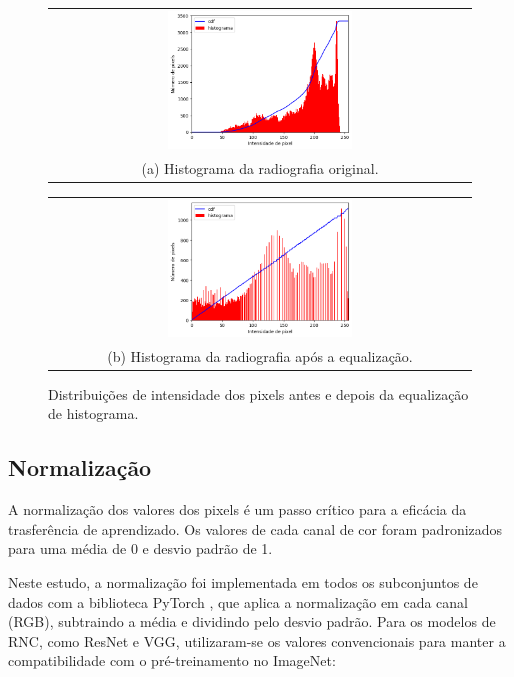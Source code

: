 \begin{figure}[!htbp]
    \centering
    \begin{tabular}{@{}c@{}}
        \includegraphics[width=0.45\textwidth]{figs/histograma-imagem-nao-equalizada.png} \\[\abovecaptionskip]
        \small (a) Histograma da radiografia original.
    \end{tabular}
    \hfill
    \begin{tabular}{@{}c@{}}
        \includegraphics[width=0.45\textwidth]{figs/histograma-imagem-equalizada.png} \\[\abovecaptionskip]
        \small (b) Histograma da radiografia após a equalização.
    \end{tabular}
    \caption{Distribuições de intensidade dos pixels antes e depois da equalização de histograma.}
    \label{fig:histogram-equalization-histogram}
\end{figure}

\subsection{Normalização}

A normalização dos valores dos pixels é um passo crítico para a eficácia da trasferência de aprendizado. Os valores de cada canal de cor foram padronizados para uma média de 0 e desvio padrão de 1.

Neste estudo, a normalização foi implementada em todos os subconjuntos de dados com a biblioteca PyTorch \cite{pytorch}, que aplica a normalização em cada canal (RGB), subtraindo a média e dividindo pelo desvio padrão. Para os modelos de RNC, como ResNet e VGG, utilizaram-se os valores convencionais para manter a compatibilidade com o pré-treinamento no ImageNet:

